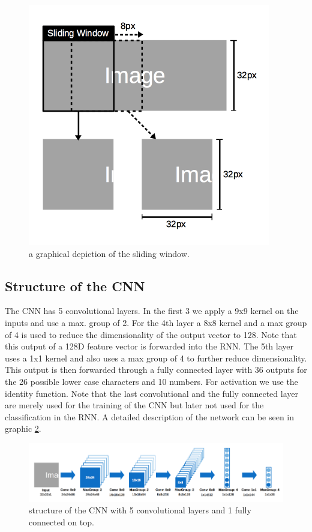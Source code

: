 \documentclass{utue} %
\begin{document}
\begin{figure}[h!]
	\centering
	\includegraphics[width=.9\columnwidth]{graphics/model_sliding_window.png}
	\caption{\label{fig:sliding_window} \footnotesize{a graphical depiction of the sliding window.}}
\end{figure}


\subsection{Structure of the CNN}
The CNN has 5 convolutional layers. In the first 3 we apply a 9x9 kernel on the inputs and use a max. group of 2. For the 4th layer a 8x8 kernel and a max group of 4 is used to reduce the dimensionality of the output vector to 128. Note that this output of a 128D feature vector is forwarded into the RNN. The 5th layer uses a 1x1 kernel %
and also uses a max group of 4 to further reduce dimensionality. This output is then forwarded through a fully connected layer with 36 outputs for the 26 possible lower case characters and 10 numbers. For activation we use the identity function. Note that the last convolutional and the fully connected layer are merely used for the training of the CNN but later not used for the classification in the RNN. A detailed description of the network can be seen in graphic \ref{fig:cnn_structure}.

\begin{figure}[h!]
	\centering
	\includegraphics[width=.9\columnwidth]{graphics/model_cnn.png}
	\caption{\label{fig:cnn_structure} \footnotesize{structure of the CNN with 5 convolutional layers and 1 fully connected on top.}}
\end{figure}
\end{document}
